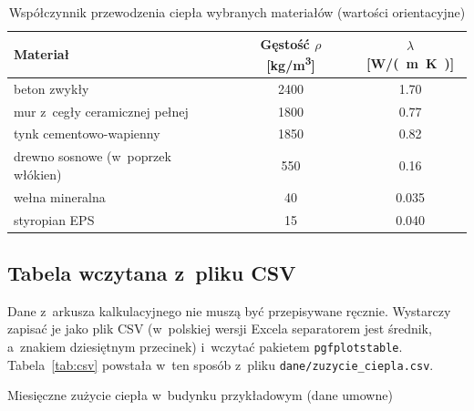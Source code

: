 \begin{table}[htbp]
  \centering
  \caption{Współczynnik przewodzenia ciepła wybranych materiałów (wartości
    orientacyjne)}
  \label{tab:lambda}
  \begin{tabular}{@{}l S[table-format=4.0] S[table-format=1.3]@{}}
    \toprule
    \textbf{Materiał} & {\textbf{Gęstość} $\rho$ [\unit{kg/m^3}]}
                      & {$\lambda$ [\unit{W/(m.K)}]} \\
    \midrule
    beton zwykły                          & 2400 & 1.70  \\
    mur z~cegły ceramicznej pełnej        & 1800 & 0.77  \\
    tynk cementowo-wapienny               & 1850 & 0.82  \\
    drewno sosnowe (w~poprzek włókien)    & 550  & 0.16  \\
    wełna mineralna                       & 40   & 0.035 \\
    styropian EPS                         & 15   & 0.040 \\
    \bottomrule
  \end{tabular}
\end{table}

\subsection{Tabela wczytana z~pliku CSV}

Dane z~arkusza kalkulacyjnego nie muszą być przepisywane ręcznie. Wystarczy
zapisać je jako plik CSV (w~polskiej wersji Excela separatorem jest średnik,
a~znakiem dziesiętnym przecinek) i~wczytać pakietem \texttt{pgfplotstable}.
Tabela~\ref{tab:csv} powstała w~ten sposób z~pliku
\texttt{dane/zuzycie\_ciepla.csv}.

\begin{table}[htbp]
  \centering
  \caption{Miesięczne zużycie ciepła w~budynku przykładowym (dane umowne)}
  \label{tab:csv}
\end{table}

